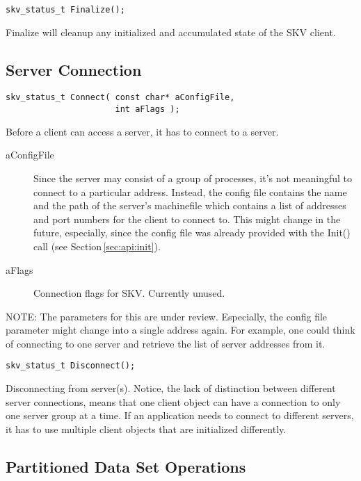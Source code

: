\begin{lstlisting}
skv_status_t Finalize();
\end{lstlisting}

Finalize will cleanup any initialized and accumulated state of the SKV
client.


\subsection{Server Connection}\label{sec:api:connect}

\begin{lstlisting}
skv_status_t Connect( const char* aConfigFile,
                      int aFlags );
\end{lstlisting}

Before a client can access a server, it has to connect to a server.
\begin{description}
\item[aConfigFile] Since the server may consist of a group of
  processes, it's not meaningful to connect to a particular address.
  Instead, the config file contains the name and the path of the
  server's machinefile which contains a list of addresses and port
  numbers for the client to connect to.  This might change in the
  future, especially, since the config file was already provided with
  the Init() call (see Section\,\ref{sec:api:init}).
\item[aFlags] Connection flags for SKV. Currently unused.
\end{description}

NOTE: The parameters for this are under review.  Especially, the
config file parameter might change into a single address again. For
example, one could think of connecting to one server and retrieve the
list of server addresses from it.


\begin{lstlisting}
skv_status_t Disconnect();
\end{lstlisting}

Disconnecting from server(s).  Notice, the lack of distinction between
different server connections, means that one client object can have a
connection to only one server group at a time.  If an application
needs to connect to different servers, it has to use multiple client
objects that are initialized differently.



\subsection{Partitioned Data Set Operations}\label{sec:api:pds_ops}

